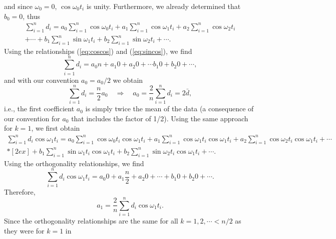 and since $\omega_{0} = 0$, $\cos \omega _0 t_i$ is unity. Furthermore, we already determined that $b_0 = 0$, thus
\begin{equation}
\begin{array}{c}
\sum^{n}_{i=1}d_{i} = a_{0} \sum^{n}_{i=1} \cos \omega_{0}t_{i} + a_{1}\sum^{n}_{i=1} \cos \omega_{1} t_{i} + a_2 \sum^{n}_{i=1} \cos \omega _2 t_i \\[4pt]
+ \cdots + b_1 \sum^n_{i=1} \sin \omega _1 t_i + b_2 \sum ^n_{i=1} \sin \omega_2 t_i + \cdots .
\end{array}
\end{equation}
Using the relationships (\ref{eq:coscos}) and (\ref{eq:sincos}), we find
\begin{equation}
\sum^n_{i=1} d_i = a_0n + a_1 0+ a_2 0 +  \cdots b_1 0 + b_2 0 + \cdots,
\end{equation}
and with our convention $a_0 = a_0/2$ we obtain
\begin{equation}
\sum^n_{i=1} d_i = \frac{n}{2}a_0 \quad \Rightarrow \quad a_0 = \frac{2}{n} 
\sum^n_{i=1} d_i = 2 \bar{d},
\end{equation}
i.e., the first coefficient $a_0$ is simply twice the mean of the data (a consequence of our convention for $a_0$ 
that includes the factor of 1/2).	
Using the same approach for $k = 1$, we first obtain
\begin{equation}
\begin{array}{c}
\displaystyle \sum^n_{i=1} d_i \cos \omega_1 t_i = a_0 \sum^n_{i=1} \cos \omega _0 t_i \cos \omega _1 t_i +  a_1 \sum^n_{i=1} \cos \omega_1 t_i \cos \omega _1 t_i + a_2 \sum^n_{i=1} \cos \omega_2 t_i \cos 
\omega _1 t_i + \cdots \\*[2ex]
+ b_1 \displaystyle \sum^n_{i=1} \sin \omega_1 t_i \cos \omega_1 t_i + b_2 \displaystyle \sum^n_{i=1} \sin \omega_2 t_i \cos \omega_1 t_i + \cdots.
\end{array}
\end{equation}
Using the orthogonality relationships, we find
\begin{equation}
\displaystyle \sum^n_{i=1}  d_i \cos \omega_1 t_i = a_0 0 + a_1 \frac{n}{2} + a_2 0 + \cdots + b_1 0 + b_2 0 + \cdots .
\end{equation}
Therefore,
\begin{equation}
a_1 = \frac{2}{n} \displaystyle \sum^n_{i=1} d_i \cos \omega_1 t_i.
\label{eq:a1coeff}
\end{equation}
Since the orthogonality relationships are the same for all $k = 1, 2, \cdots < n/2$ as they were for $k = 1$  in 
